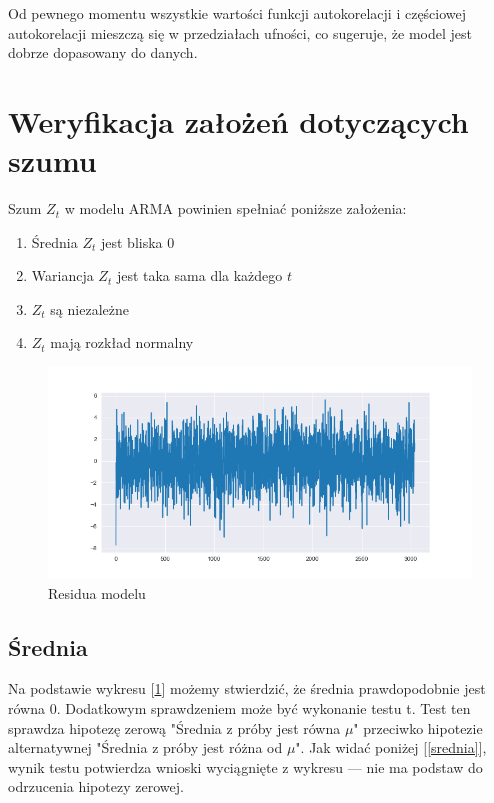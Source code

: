 \documentclass{article}
\theoremstyle{break}
\begin{document}
	Od pewnego momentu wszystkie wartości funkcji autokorelacji i częściowej autokorelacji mieszczą się w przedziałach ufności, co sugeruje, że model jest dobrze dopasowany do danych.
	
	
	\section{Weryfikacja założeń dotyczących szumu}
	
	Szum ${Z_t}$ w modelu ARMA powinien spełniać poniższe założenia:
	\begin{enumerate}
		\item Średnia ${Z_t}$ jest bliska 0
		\item Wariancja ${Z_t}$ jest taka sama dla każdego $t$
		\item ${Z_t}$ są niezależne
		\item ${Z_t}$ mają rozkład normalny
	\end{enumerate}
	
	\begin{figure}[H]
		\begin{center}
			\includegraphics[scale=0.63]{res.png}
			\caption{Residua modelu}
			\label{fig:res}
		\end{center}
	\end{figure}
	
	\subsection{Średnia}
	Na podstawie wykresu [\ref{fig:res}] możemy stwierdzić, że średnia prawdopodobnie jest równa 0. Dodatkowym sprawdzeniem może być wykonanie testu t. Test ten sprawdza hipotezę zerową "Średnia z próby jest równa $\mu$" przeciwko hipotezie alternatywnej "Średnia z próby jest różna od $\mu$". Jak widać poniżej [\ref{srednia}], wynik testu potwierdza wnioski wyciągnięte z wykresu — nie ma podstaw do odrzucenia hipotezy zerowej.
	
\end{document}

